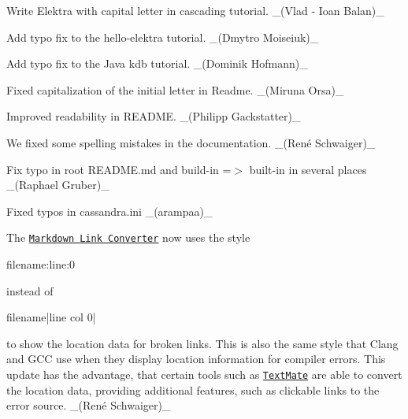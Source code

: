 \begin{DoxyItemize}
\item Write Elektra with capital letter in cascading tutorial. \+\_\+(Vlad -\/ Ioan Balan)\+\_\+
\item Add typo fix to the hello-\/elektra tutorial. \+\_\+(\+Dmytro Moiseiuk)\+\_\+
\item Add typo fix to the Java kdb tutorial. \+\_\+(\+Dominik Hofmann)\+\_\+
\item Fixed capitalization of the initial letter in Readme. \+\_\+(\+Miruna Orsa)\+\_\+
\item Improved readability in R\+E\+A\+D\+ME. \+\_\+(\+Philipp Gackstatter)\+\_\+
\item We fixed some spelling mistakes in the documentation. \+\_\+(René Schwaiger)\+\_\+
\item Fix typo in root R\+E\+A\+D\+M\+E.\+md and \textquotesingle{}build-\/in\textquotesingle{} =$>$ \textquotesingle{}built-\/in\textquotesingle{} in several places \+\_\+(\+Raphael Gruber)\+\_\+
\item Fixed typos in {\ttfamily cassandra.\+ini} \+\_\+(arampaa)\+\_\+
\end{DoxyItemize}


\begin{DoxyItemize}
\item The \href{https://master.libelektra.org/doc/markdownlinkconverter}{\tt Markdown Link Converter} now uses the style
\end{DoxyItemize}


\begin{DoxyCode}
filename:line:0
\end{DoxyCode}


instead of


\begin{DoxyCode}
filename|line col 0|
\end{DoxyCode}


to show the location data for broken links. This is also the same style that Clang and G\+CC use when they display location information for compiler errors. This update has the advantage, that certain tools such as \href{https://macromates.com}{\tt Text\+Mate} are able to convert the location data, providing additional features, such as clickable links to the error source. \+\_\+(René Schwaiger)\+\_\+


